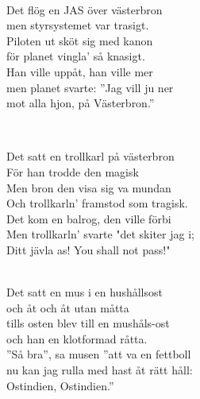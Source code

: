  \\       

\songtext{}Det flög en JAS över västerbron \\
men styrsystemet var trasigt.\\
Piloten ut sköt sig med kanon\\
för planet vingla' så knasigt.\\
Han ville uppåt, han ville mer\\
men planet svarte: ”Jag vill ju ner\\
mot alla hjon, på Västerbron.” 


\newpage

 \\       

\songtext{}Det satt en trollkarl på västerbron\\
För han trodde den magisk\\
Men bron den visa sig va mundan\\
Och trollkarln’ framstod som tragisk.\\ 
Det kom en balrog, den ville förbi\\
Men trollkarln’ svarte "det skiter jag i;\\ 
Ditt jävla as! You shall not pass!" \\


 \\       

\songtext{}Det satt en mus i en hushållsost\\
och åt och åt utan måtta\\ 
tills osten blev till en mushåls-ost\\ 
och han en klotformad råtta.\\ 
”Så bra”, sa musen ”att va en fettboll\\ 
nu kan jag rulla med hast åt rätt håll:\\ 
Ostindien, Ostindien.” \\

\newpage 

